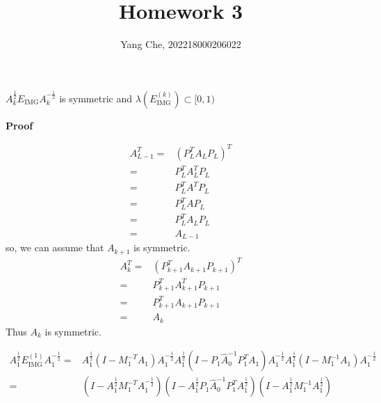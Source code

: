 \documentclass{article}
\title{Homework 3} %
\author{Yang Che,  202218000206022} %
\date{} %
\begin{document}

\maketitle %

\section{ }
$A_k^{\frac{1}{2}}E_\text{IMG}A_k^{-\frac{1}{2}}$ is symmetric and $\lambda(E_\text{IMG}^{(k)})\subset[0,1)$


\textbf{Proof}

\begin{equation*}\begin{aligned}A_{L-1}^T= & (P_L^TA_LP_L)^T \\
               =          & P_L^TA_L^TP_L   \\
               =          & P_L^TA^TP_L     \\
               =          & P_L^TAP_L       \\
               =          & P_L^TA_LP_L     \\
               =          & A_{L-1}\end{aligned}\end{equation*}
so, we can assume that $A_{k+1}$ is symmetric.
\begin{equation*}
    \begin{aligned}
        A_{k}^T= & (P_{k+1}^TA_{k+1}P_{k+1})^T \\
        =        & P_{k+1}^TA_{k+1}^TP_{k+1}   \\
        =        & P_{k+1}^TA_{k+1}P_{k+1}     \\
        =        & A_{k}
    \end{aligned}
\end{equation*}
Thus $A_k$ is symmetric.

\begin{equation*}
    \begin{aligned}
        A_1^{\frac{1}{2}}E_\text{IMG}^{(1)}A_1^{-\frac{1}{2}}= & A_1^{\frac{1}{2}}(I-M_1^{-T}A_1)A_1^{-\frac{1}{2}} A_1^{\frac{1}{2}}(I-P_1\hat{A}_0^{-1}P_1^TA_1)A_1^{-\frac{1}{2}}A_1^{\frac{1}{2}}(I-M_1^{-1}A_1)A_1^{-\frac{1}{2}} \\
        =                                                      & (I-A_1^{\frac{1}{2}}M_1^{-T}A_1^{-\frac{1}{2}})(I-A_1^{\frac{1}{2}}P_1\hat{A}_0^{-1}P_1^TA_1^{ \frac{1}{2}})(I-A_1^{\frac{1}{2}}M_1^{-1}A_1^{\frac{1}{2}})            \\
    \end{aligned}
\end{equation*}
\end{document}

